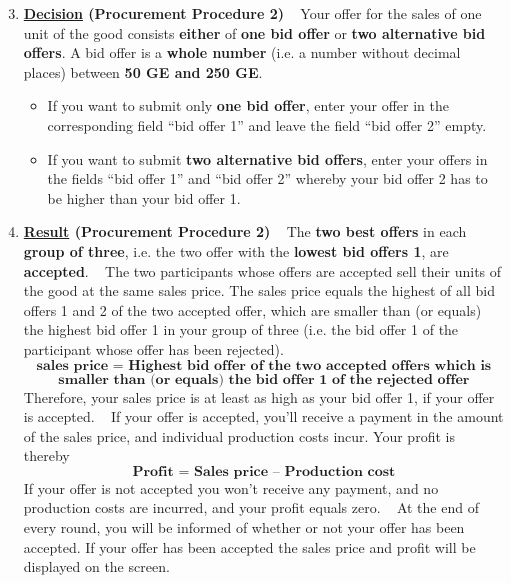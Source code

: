 \documentclass[11pt]{article}
\begin{document}
\begin{enumerate}[label=\textbf{\upshape(\arabic*\upshape)}] \setcounter{enumi}{2}
	\item \textbf{\underline{Decision} (Procurement Procedure 2)} ~\smallbreak
		Your offer for the sales of one unit of the good consists \textbf{either} of \textbf{one bid offer} or \textbf{two alternative bid offers}. A bid offer is a \textbf{whole number} (i.e. a number without decimal places) between \textbf{50 GE and 250 GE}. 
		\begin{itemize}
			\item If you want to submit only \textbf{one bid offer}, enter your offer in the corresponding field \enquote{bid offer 1} and leave the field \enquote{bid offer 2} empty.
			\item If you want to submit \textbf{two alternative bid offers}, enter your offers in the fields \enquote{bid offer 1} and \enquote{bid offer 2} whereby your bid offer 2 has to be higher than your bid offer 1.
		\end{itemize}
	\item \textbf{\underline{Result} (Procurement Procedure 2)} ~\smallbreak
		The \textbf{two best offers} in each \textbf{group of three}, i.e. the two offer with the \textbf{lowest bid offers 1}, are \textbf{accepted}. ~\medbreak
		The two participants whose offers are accepted sell their units of the good at the same sales price. The sales price equals the highest of all bid offers 1 and 2 of the two accepted offer, which are smaller than (or equals) the highest bid offer 1 in your group of three (i.e. the bid offer 1 of the participant whose offer has been rejected).
		$$ \textbf{sales price = Highest bid offer of the two accepted offers which is} $$
				$$\textbf{smaller than (or equals) the bid offer 1 of the rejected offer} $$
		Therefore, your sales price is at least as high as your bid offer 1, if your offer is accepted. ~\medbreak
		If your offer is accepted, you’ll receive a payment in the amount of the sales price, and individual production costs incur. Your profit is thereby
		$$ \textbf{Profit = Sales price – Production cost} $$
		If your offer is not accepted you won’t receive any payment, and no production costs are incurred, and your profit equals zero. ~\smallbreak
		At the end of every round, you will be informed of whether or not your offer has been accepted. If your offer has been accepted the sales price and profit will be displayed on the screen.
\end{enumerate}
\end{document}
